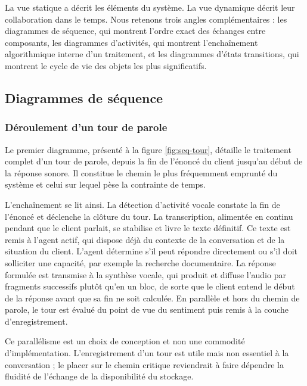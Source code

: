 La vue statique a décrit les éléments du système. La vue dynamique décrit leur collaboration dans le temps. Nous retenons trois angles complémentaires : les diagrammes de séquence, qui montrent l'ordre exact des échanges entre composants, les diagrammes d'activités, qui montrent l'enchaînement algorithmique interne d'un traitement, et les diagrammes d'états transitions, qui montrent le cycle de vie des objets les plus significatifs.

\subsection{Diagrammes de séquence}

\subsubsection{Déroulement d'un tour de parole}

Le premier diagramme, présenté à la figure \ref{fig:seq-tour}, détaille le traitement complet d'un tour de parole, depuis la fin de l'énoncé du client jusqu'au début de la réponse sonore. Il constitue le chemin le plus fréquemment emprunté du système et celui sur lequel pèse la contrainte de temps.

L'enchaînement se lit ainsi. La détection d'activité vocale constate la fin de l'énoncé et déclenche la clôture du tour. La transcription, alimentée en continu pendant que le client parlait, se stabilise et livre le texte définitif. Ce texte est remis à l'agent actif, qui dispose déjà du contexte de la conversation et de la situation du client. L'agent détermine s'il peut répondre directement ou s'il doit solliciter une capacité, par exemple la recherche documentaire. La réponse formulée est transmise à la synthèse vocale, qui produit et diffuse l'audio par fragments successifs plutôt qu'en un bloc, de sorte que le client entend le début de la réponse avant que sa fin ne soit calculée. En parallèle et hors du chemin de parole, le tour est évalué du point de vue du sentiment puis remis à la couche d'enregistrement.

Ce parallélisme est un choix de conception et non une commodité d'implémentation. L'enregistrement d'un tour est utile mais non essentiel à la conversation ; le placer sur le chemin critique reviendrait à faire dépendre la fluidité de l'échange de la disponibilité du stockage.


